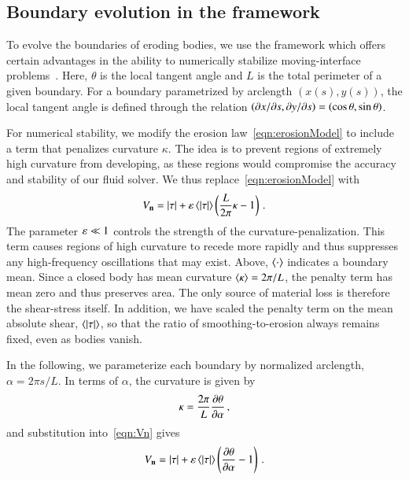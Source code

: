 \documentclass[preprint, 10pt]{elsarticle}
\begin{document}
\subsection{Boundary evolution in the {\thL} framework} 
\label{sec:thetaL}

To evolve the boundaries of eroding bodies, we use the {\thL} framework which offers certain advantages in the ability to numerically stabilize moving-interface problems~\cite{hou-low-she1994}. Here, $\theta$ is the local tangent angle and $L$ is the total perimeter of a given boundary. For a boundary parametrized by arclength $(x(s),y(s))$, the local tangent angle is defined through the relation $\left( \partial {x}/\partial {s}, \partial {y}/\partial {s} \right) = \left(\cos \theta, \sin \theta \right)$.  

For numerical stability, we modify the erosion law~\eqref{eqn:erosionModel} to include a term that penalizes curvature $\kappa$. The idea is to prevent regions of extremely high curvature from developing, as these regions would compromise the accuracy and stability of our fluid solver. We thus replace~\eqref{eqn:erosionModel} with
\begin{align}
  \label{eqn:Vn}
  V_{\mathbf{n}} = \lvert \tau \rvert + \varepsilon \left< \lvert \tau \rvert \right> \left( \frac{L }{2\pi} \kappa - 1
  \right) \, .
\end{align}
The parameter $\varepsilon \ll 1$ controls the strength of the curvature-penalization. This term causes regions of high curvature to recede more rapidly and thus suppresses any high-frequency oscillations that may exist. Above, $\left< \cdot \right>$ indicates a boundary mean. Since a closed body has mean curvature $\left< \kappa \right> = 2\pi / L$, the penalty term has mean zero and thus preserves area. The only source of material loss is therefore the shear-stress itself. In addition, we have scaled the penalty term on the mean absolute shear, $\left< \lvert \tau \rvert \right>$, so that the ratio of smoothing-to-erosion always remains fixed, even as bodies vanish.  

In the following, we parameterize each boundary by normalized arclength, $\alpha = 2 \pi s / L$. In terms of $\alpha$, the curvature is given by
\begin{align}
\kappa = \frac{2 \pi}{L} \frac{\partial \theta}{\partial \alpha} \, ,
\end{align}
and substitution into~\eqref{eqn:Vn} gives
\begin{align}
\label{eqn:Vn2}
  V_{\mathbf{n}} = \lvert \tau \rvert +  \varepsilon \left< \lvert \tau \rvert \right>   \left(\frac{\partial \theta}{\partial \alpha} - 1 \right) \, .
\end{align}
\end{document}
